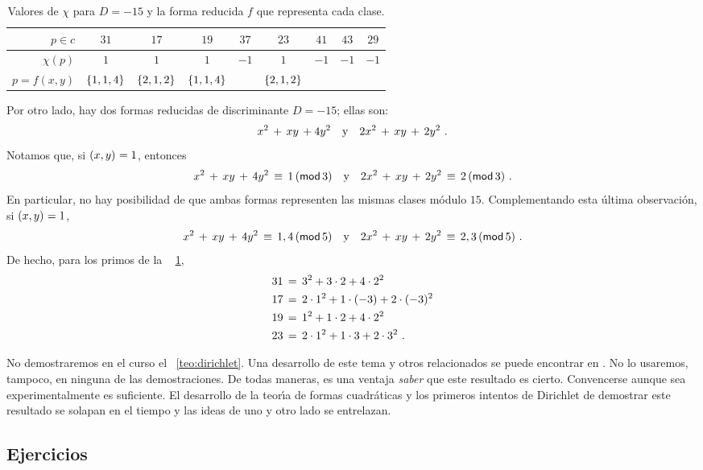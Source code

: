 \begin{ejemDirichlet}
\begin{table}
\begin{tabular}{r|cccccccc}
			\hline
			$p\in c$ & $31$ & $17$ & $19$ & $37$
				& $23$ & $41$ & $43$ & $29$ \\
			\hline
			$\chi(p)$ & $1$ & $1$ & $1$ & $-1$
				& $1$ & $-1$ & $-1$ & $-1$ \\
			\hline
			$p=f(x,y)$ & $\binaria{1,1,4}$ & $\binaria{2,1,2}$
				& $\binaria{1,1,4}$ &
				& $\binaria{2,1,2}$ & & &
		\end{tabular}
		\caption{
			Valores de $\chi$ para $D=-15$ y la forma
			reducida $f$ que representa cada clase.
		}\label{tab:ejem:dirichlet:representacion:quince}
	\end{table}
	Por otro lado, hay dos formas reducidas de discriminante $D=-15$;
	ellas son:
	\begin{displaymath}
		x^2\,+\,xy\,+4y^2
		\dispand
		2x^2\,+\,xy\,+\,2y^2
		\dispstop
	\end{displaymath}
	Notamos que, si $\mcd{x,y}=1$, entonces
	\begin{displaymath}
		x^2\,+\,xy\,+\,4y^2\,\equiv\,1\tmodulo[3]
		\dispand
		2x^2\,+\,xy\,+\,2y^2\,\equiv\,2\tmodulo[3]
		\dispstop
	\end{displaymath}
	En particular, no hay posibilidad de que ambas formas
	representen las mismas clases m\'odulo $15$.
	Complementando esta \'ultima observaci\'on,
	si $\mcd{x,y}=1$,
	\begin{displaymath}
		x^2\,+\,xy\,+\,4y^2\,\equiv\,1,4\tmodulo[5]
		\dispand
		2x^2\,+\,xy\,+\,2y^2\,\equiv\,2,3\tmodulo[5]
		\dispstop
	\end{displaymath}
	De hecho, para los primos de la \tablename~%
	\ref{tab:ejem:dirichlet:representacion:quince},
	\begin{displaymath}
		\begin{aligned}
			31 & \,=\, 3^2+3\cdot 2+4\cdot 2^2 \\
			17 & \,=\, 2\cdot 1^2+1\cdot (-3)+2\cdot (-3)^2 \\
			19 & \,=\, 1^2+1\cdot 2+4\cdot 2^2 \\
			23 & \,=\,2\cdot 1^2+1\cdot 3+2\cdot 3^2
			\dispstop
		\end{aligned}
	\end{displaymath}
\end{ejemDirichlet}

No demostraremos en el curso el \teoname~\ref{teo:dirichlet}.
Una desarrollo de este tema y otros relacionados se puede encontrar en
\cite{Davenport}. No lo usaremos, tampoco, en ninguna de las
demostraciones.
De todas maneras, es una ventaja \emph{saber} que este resultado es
cierto. Convencerse aunque sea experimentalmente es suficiente.
El desarrollo de la teor\'{\i}a de formas cuadr\'aticas y los primeros
intentos de Dirichlet de demostrar este resultado se solapan en el tiempo
y las ideas de uno y otro lado se entrelazan.

\subsection*{Ejercicios}


